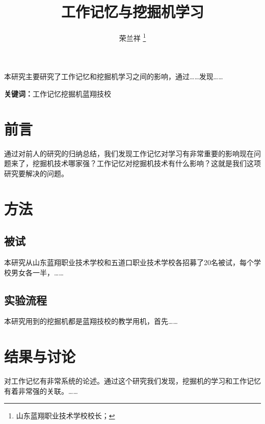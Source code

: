 \documentclass[UTF8,a4paper]{ctexart}
\title{\bfseries 工作记忆与挖掘机学习}
\author{荣兰祥 \thanks{山东蓝翔职业技术学校校长；}}
\date{}
\begin{document}
\maketitle


\begin{center}
\parbox{130mm}{
本研究主要研究了工作记忆和挖掘机学习之间的影响，通过……发现……
\par
\vspace{1mm}
{\bfseries 关键词：}工作记忆\quad 挖掘机\quad 蓝翔技校}
\end{center}



\section{前言}
通过对前人的研究的归纳总结，我们发现工作记忆对学习有非常重要的影响现在问题来了，挖掘机技术哪家强？工作记忆对挖掘机技术有什么影响？这就是我们这项研究要解决的问题。

\section{方法}
\subsection{被试}
本研究从山东蓝翔职业技术学校和五道口职业技术学校各招募了20名被试，每个学校男女各一半，……

\subsection{实验流程}
本研究用到的挖掘机都是蓝翔技校的教学用机，首先……

\section{结果与讨论}
对工作记忆有非常系统的论述。通过这个研究我们发现，挖掘机的学习和工作记忆有着非常强的关联。……


\renewcommand{\refname}{参考文献}

\end{document}
